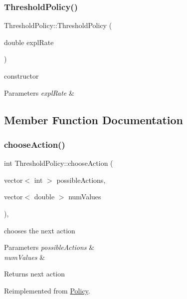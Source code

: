 \subsubsection{\texorpdfstring{Threshold\+Policy()}{ThresholdPolicy()}}
{\footnotesize\ttfamily Threshold\+Policy\+::\+Threshold\+Policy (\begin{DoxyParamCaption}\item[{double}]{expl\+Rate }\end{DoxyParamCaption})\hspace{0.3cm}{\ttfamily [inline]}}

constructor 
\begin{DoxyParams}{Parameters}
{\em expl\+Rate} & \\
\hline
\end{DoxyParams}


\subsection{Member Function Documentation}
\mbox{\label{class_threshold_policy_a9f8e4051589b915971ffc647ba7fe623}} 
\subsubsection{\texorpdfstring{choose\+Action()}{chooseAction()}}
{\footnotesize\ttfamily int Threshold\+Policy\+::choose\+Action (\begin{DoxyParamCaption}\item[{vector$<$ int $>$}]{possible\+Actions,  }\item[{vector$<$ double $>$}]{num\+Values }\end{DoxyParamCaption})\hspace{0.3cm}{\ttfamily [inline]}, {\ttfamily [virtual]}}

chooses the next action 
\begin{DoxyParams}{Parameters}
{\em possible\+Actions} & \\
\hline
{\em num\+Values} & \\
\hline
\end{DoxyParams}
\begin{DoxyReturn}{Returns}
next action 
\end{DoxyReturn}


Reimplemented from \mbox{\hyperlink{class_policy_a7afb2eee3c77b96a58d992acb4e0e1a8}{Policy}}.

